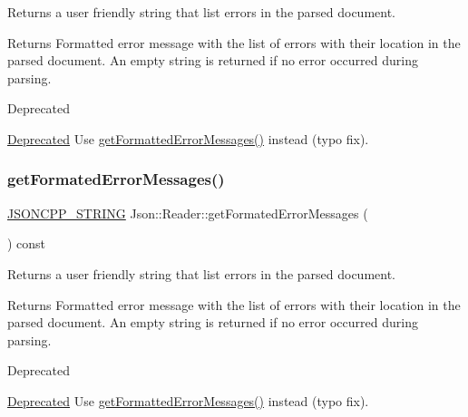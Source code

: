 Returns a user friendly string that list errors in the parsed document. 

\begin{DoxyReturn}{Returns}
Formatted error message with the list of errors with their location in the parsed document. An empty string is returned if no error occurred during parsing. 
\end{DoxyReturn}
\begin{DoxyRefDesc}{Deprecated}
\item[\hyperlink{deprecated__deprecated000012}{Deprecated}]Use \hyperlink{class_json_1_1_reader_ae638a7b1f36f7ccf99ba89fa36ccf222}{get\+Formatted\+Error\+Messages()} instead (typo fix). \end{DoxyRefDesc}
\hypertarget{class_json_1_1_reader_a791cbc5afd1bef1631e07239dc452c79}{}\label{class_json_1_1_reader_a791cbc5afd1bef1631e07239dc452c79} 
\subsubsection{\texorpdfstring{get\+Formated\+Error\+Messages()}{getFormatedErrorMessages()}\hspace{0.1cm}{\footnotesize\ttfamily [2/2]}}
{\footnotesize\ttfamily \hyperlink{config_8h_a1e723f95759de062585bc4a8fd3fa4be}{J\+S\+O\+N\+C\+P\+P\+\_\+\+S\+T\+R\+I\+NG} Json\+::\+Reader\+::get\+Formated\+Error\+Messages (\begin{DoxyParamCaption}{ }\end{DoxyParamCaption}) const}



Returns a user friendly string that list errors in the parsed document. 

\begin{DoxyReturn}{Returns}
Formatted error message with the list of errors with their location in the parsed document. An empty string is returned if no error occurred during parsing. 
\end{DoxyReturn}
\begin{DoxyRefDesc}{Deprecated}
\item[\hyperlink{deprecated__deprecated000006}{Deprecated}]Use \hyperlink{class_json_1_1_reader_ae638a7b1f36f7ccf99ba89fa36ccf222}{get\+Formatted\+Error\+Messages()} instead (typo fix). \end{DoxyRefDesc}


